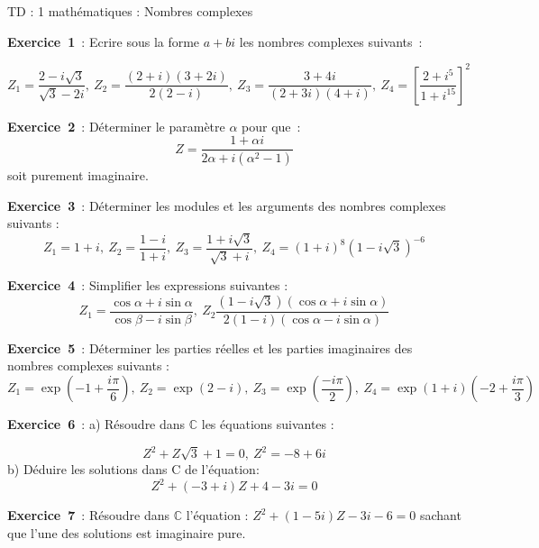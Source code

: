 \documentclass[12pt, a4paper]{article}
\begin{document}
\begin{center}
\large\sc 

TD : 1 mathématiques : Nombres complexes
\end{center}

{\bf Exercice~1}~: Ecrire sous la forme $a+bi$ les nombres complexes suivants~:

\begin{equation*}
Z_{1}=\frac{2-i\sqrt{3}}{\sqrt{3}-2i},~Z_{2}=\frac{(2+i)(3+2i)}{2(2-i)},~Z_{3} = \frac{3+4i}{(2+3i)(4+i)},~Z_{4}=[\frac{2+i^5}{1+i^{15}}]^2
\end{equation*}

{\bf Exercice~2}~: Déterminer le paramètre $\alpha$ pour que~:
\begin{equation*}
Z=\frac{1+\alpha i}{2\alpha + i(\alpha^2-1)}
\end{equation*}
soit purement imaginaire.

{\bf Exercice~3}~: Déterminer les modules et les arguments des nombres complexes suivants :
\begin{equation*}
Z_{1}=1+i,~Z_{2}=\frac{1-i}{1+i},~Z_{3}=\frac{1+i\sqrt{3}}{\sqrt{3}+i},~Z_{4}=(1+i)^8(1-i\sqrt{3})^{-6}
\end{equation*}

{\bf Exercice~4}~: Simplifier les expressions suivantes :
\begin{equation*}
Z_{1}=\frac{\cos\alpha+i\sin\alpha}{\cos\beta-i\sin\beta},~Z_{2}\frac{(1-i\sqrt{3})(\cos\alpha+i\sin\alpha)}{2(1-i)(\cos\alpha-i\sin\alpha)}
\end{equation*}

{\bf Exercice~5}~: Déterminer les parties réelles et les parties imaginaires des nombres complexes suivants :
\begin{equation*}
Z_{1} = \exp(-1+\frac{i\pi}{6}),~Z_{2}=\exp(2-i),~Z_{3}=\exp(\frac{-i\pi}{2}),~Z_{4}=\exp(1+i)(-2+\frac{i\pi}{3})
\end{equation*}

{\bf Exercice~6}~: 
a) Résoudre dans $\mathbb{C}$ les équations suivantes :

\begin{equation*}
Z^2+Z\sqrt{3}+1=0,~Z^2=-8+6i
\end{equation*}
b) Déduire les solutions dans C de l'équation:
\begin{equation*}
Z^2+(-3+i)Z+4-3i=0
\end{equation*}

{\bf Exercice~7}~: Résoudre dans $\mathbb{C}$ l'équation :
$Z^2+(1-5i)Z-3i-6=0$
sachant que l'une des solutions est imaginaire pure.
\end{document}
